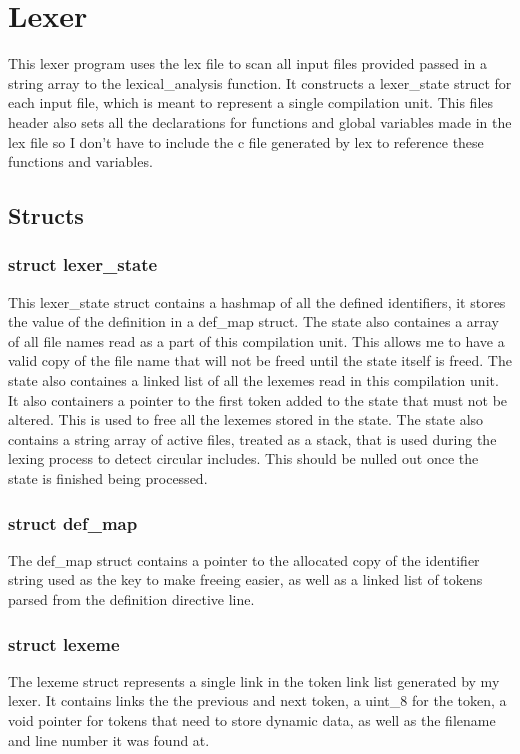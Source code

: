 \documentclass[11pt]{article}
\begin{document}
    \section{Lexer}
        This lexer program uses the lex file to scan all input files provided passed in a string array to the lexical\_analysis function.
        It constructs a lexer\_state struct for each input file, which is meant to represent a single compilation unit. This files
        header also sets all the declarations for functions and global variables made in the lex file so I don't have to include the 
        c file generated by lex to reference these functions and variables.
        
        \subsection{Structs}

            \subsubsection{struct lexer\_state}
                This lexer\_state struct contains a hashmap of all the defined identifiers, it stores the value of the definition in a def\_map struct.
                The state also containes a array of all file names read as a part of this compilation unit. This allows me to have a valid copy of the
                file name that will not be freed until the state itself is freed. The state also containes a linked list of all the lexemes read 
                in this compilation unit. It also containers a pointer to the first token added to the state that must not be altered. This is 
                used to free all the lexemes stored in the state. The state also contains a string array of active files, treated as a stack,
                that is used during the lexing process to detect circular includes. This should be nulled out once the state is finished being processed. 
            
            \subsubsection{struct def\_map}
                The def\_map struct contains a pointer to the allocated copy of the identifier string used as the key to make freeing easier,
                as well as a linked list of tokens parsed from the definition directive line.

            \subsubsection{struct lexeme}
                The lexeme struct represents a single link in the token link list generated by my lexer.
                It contains links the the previous and next token, a uint\_8 for the token, a void pointer 
                for tokens that need to store dynamic data, as well as the filename and line number it was found at.
\end{document}
